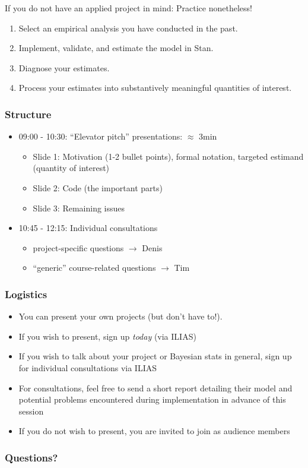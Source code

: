 \documentclass[
  11pt,
]{article}
\providecommand{\tightlist}{%
  \setlength{\itemsep}{0pt}\setlength{\parskip}{0pt}}
\begin{document}
If you do not have an applied project in mind: Practice nonetheless!

\begin{enumerate}
\def\labelenumi{\arabic{enumi}.}
\tightlist
\item
  Select an empirical analysis you have conducted in the past.
\item
  Implement, validate, and estimate the model in Stan.
\item
  Diagnose your estimates.
\item
  Process your estimates into substantively meaningful quantities of interest.
\end{enumerate}

\hypertarget{structure}{%
\subsubsection{Structure}\label{structure}}

\begin{itemize}
\tightlist
\item
  09:00 - 10:30: ``Elevator pitch'' presentations: \(\approx\) 3min

  \begin{itemize}
  \tightlist
  \item
    Slide 1: Motivation (1-2 bullet points), formal notation, targeted estimand (quantity of interest)
  \item
    Slide 2: Code (the important parts)
  \item
    Slide 3: Remaining issues
  \end{itemize}
\item
  10:45 - 12:15: Individual consultations

  \begin{itemize}
  \tightlist
  \item
    project-specific questions \(\rightarrow\) Denis
  \item
    ``generic'' course-related questions \(\rightarrow\) Tim
  \end{itemize}
\end{itemize}

\hypertarget{logistics}{%
\subsubsection{Logistics}\label{logistics}}

\begin{itemize}
\tightlist
\item
  You can present your own projects (but don't have to!).
\item
  If you wish to present, sign up \emph{today} (via ILIAS)
\item
  If you wish to talk about your project or Bayesian stats in general, sign up for individual consultations via ILIAS
\item
  For consultations, feel free to send a short report detailing their model and potential problems encountered during implementation in advance of this session
\item
  If you do not wish to present, you are invited to join as audience members
\end{itemize}

\hypertarget{questions}{%
\subsubsection{Questions?}\label{questions}}
\end{document}
